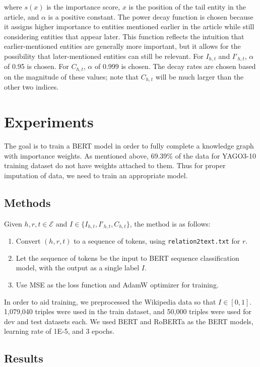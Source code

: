 \documentclass{article}
\begin{document}
where $s(x)$ is the importance score, $x$ is the position of the tail entity in the article, and $\alpha$ is a positive constant. The power decay function is chosen because it assigns higher importance to entities mentioned earlier in the article while still considering entities that appear later. This function reflects the intuition that earlier-mentioned entities are generally more important, but it allows for the possibility that later-mentioned entities can still be relevant. For $I_{h,t}$ and $I'_{h,t}$, $\alpha$ of 0.95 is chosen. For $C_{h,t}$, $\alpha$ of 0.999 is chosen. The decay rates are chosen based on the magnitude of these values; note that $C_{h,t}$ will be much larger than the other two indices.

\section{Experiments}
The goal is to train a BERT model in order to fully complete a knowledge graph with importance weights. As mentioned above, 69.39\% of the data for YAGO3-10 training dataset do not have weights attached to them. Thus for proper imputation of data, we need to train an appropriate model.

\subsection{Methods}
Given $h,r,t \in \mathcal{E}$ and $I \in \{I_{h,t}, I'_{h,t}, C_{h,t}\}$, the method is as follows:
\begin{enumerate}
\item Convert $(h,r,t)$ to a sequence of tokens, using \texttt{relation2text.txt} for $r$.
\item Let the sequence of tokens be the input to BERT sequence classification model, with the output as a single label $I$.
\item Use MSE as the loss function and AdamW optimizer for training.
\end{enumerate}

In order to aid training, we preprocessed the Wikipedia data so that $I \in [0,1]$. 1,079,040 triples were used in the train dataset, and 50,000 triples were used for dev and test datasets each. We used BERT and RoBERTa\cite{https://doi.org/10.48550/arxiv.1907.11692} as the BERT models, learning rate of 1E-5, and 3 epochs.

\subsection{Results}
\end{document}
